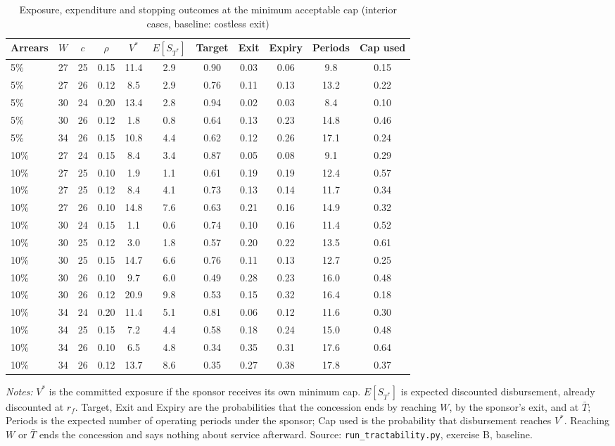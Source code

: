 \begin{table}[htbp]\centering\small
\caption{Exposure, expenditure and stopping outcomes at the minimum acceptable cap (interior cases, baseline: costless exit)}\label{tab:C}
\begin{threeparttable}\begin{tabular}{lcccccccccc}\toprule
Arrears & $W$ & $c$ & $\rho$ & $V^*$ & $E[S_{T^*}]$ & Target & Exit & Expiry & Periods & Cap used\\\midrule
5\% & 27 & 25 & 0.15 & 11.4 & 2.9 & 0.90 & 0.03 & 0.06 & 9.8 & 0.15\\
5\% & 27 & 26 & 0.12 & 8.5 & 2.9 & 0.76 & 0.11 & 0.13 & 13.2 & 0.22\\
5\% & 30 & 24 & 0.20 & 13.4 & 2.8 & 0.94 & 0.02 & 0.03 & 8.4 & 0.10\\
5\% & 30 & 26 & 0.12 & 1.8 & 0.8 & 0.64 & 0.13 & 0.23 & 14.8 & 0.46\\
5\% & 34 & 26 & 0.15 & 10.8 & 4.4 & 0.62 & 0.12 & 0.26 & 17.1 & 0.24\\
10\% & 27 & 24 & 0.15 & 8.4 & 3.4 & 0.87 & 0.05 & 0.08 & 9.1 & 0.29\\
10\% & 27 & 25 & 0.10 & 1.9 & 1.1 & 0.61 & 0.19 & 0.19 & 12.4 & 0.57\\
10\% & 27 & 25 & 0.12 & 8.4 & 4.1 & 0.73 & 0.13 & 0.14 & 11.7 & 0.34\\
10\% & 27 & 26 & 0.10 & 14.8 & 7.6 & 0.63 & 0.21 & 0.16 & 14.9 & 0.32\\
10\% & 30 & 24 & 0.15 & 1.1 & 0.6 & 0.74 & 0.10 & 0.16 & 11.4 & 0.52\\
10\% & 30 & 25 & 0.12 & 3.0 & 1.8 & 0.57 & 0.20 & 0.22 & 13.5 & 0.61\\
10\% & 30 & 25 & 0.15 & 14.7 & 6.6 & 0.76 & 0.11 & 0.13 & 12.7 & 0.25\\
10\% & 30 & 26 & 0.10 & 9.7 & 6.0 & 0.49 & 0.28 & 0.23 & 16.0 & 0.48\\
10\% & 30 & 26 & 0.12 & 20.9 & 9.8 & 0.53 & 0.15 & 0.32 & 16.4 & 0.18\\
10\% & 34 & 24 & 0.20 & 11.4 & 5.1 & 0.81 & 0.06 & 0.12 & 11.6 & 0.30\\
10\% & 34 & 25 & 0.15 & 7.2 & 4.4 & 0.58 & 0.18 & 0.24 & 15.0 & 0.48\\
10\% & 34 & 26 & 0.10 & 6.5 & 4.8 & 0.34 & 0.35 & 0.31 & 17.6 & 0.64\\
10\% & 34 & 26 & 0.12 & 13.7 & 8.6 & 0.35 & 0.27 & 0.38 & 17.8 & 0.37\\
\bottomrule\end{tabular}
\begin{tablenotes}\footnotesize\item \textit{Notes:} $V^*$ is the committed exposure if the sponsor receives its own minimum cap. $E[S_{T^*}]$ is expected discounted disbursement, already discounted at $r_f$. Target, Exit and Expiry are the probabilities that the concession ends by reaching $W$, by the sponsor's exit, and at $\bar T$; Periods is the expected number of operating periods under the sponsor; Cap used is the probability that disbursement reaches $V^*$. Reaching $W$ or $\bar T$ ends the concession and says nothing about service afterward. Source: \texttt{run\_tractability.py}, exercise B, baseline.\end{tablenotes}

\end{threeparttable}
\end{table}
